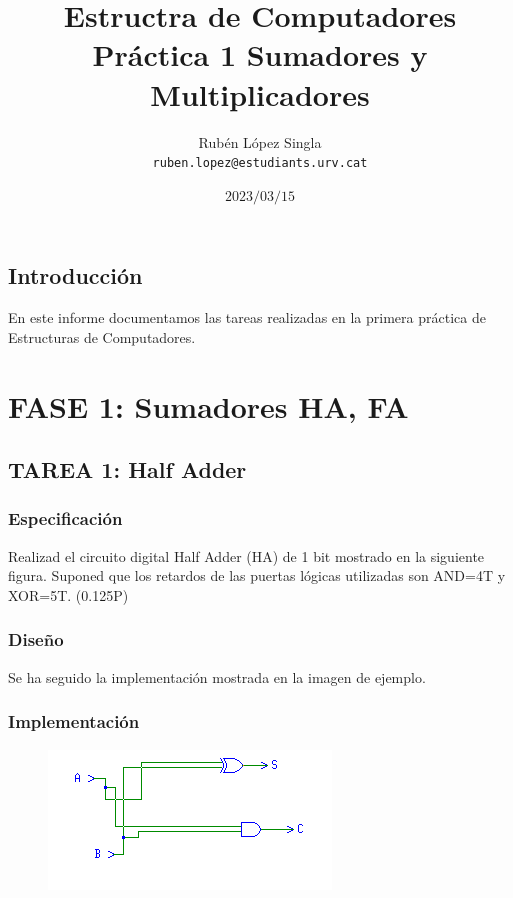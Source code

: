 \documentclass{article}
\title{Estructra de Computadores \\
	Práctica 1
	\medbreak
	\large Sumadores y Multiplicadores \\
	\bigbreak}
\author{Rubén López Singla\\
	\texttt{ruben.lopez@estudiants.urv.cat}
}
\date{\bigbreak $2023/03/15$}
\begin{document}
\maketitle

\newpage
\subsection*{Introducción}
En este informe documentamos las tareas realizadas en la primera práctica de Estructuras de Computadores. 

\renewcommand*\contentsname{Índice}
\setcounter{secnumdepth}{0} %
\tableofcontents


\newpage
\section{FASE 1: Sumadores HA, FA}
	\subsection{TAREA 1: Half Adder}
		\subsubsection*{Especificación}
		Realizad el circuito digital Half Adder (HA) de 1 bit mostrado en la siguiente figura.
		Suponed que los retardos de las puertas lógicas utilizadas son AND=4T y XOR=5T. (0.125P)

		\subsubsection*{Diseño}
		Se ha seguido la implementación mostrada en la imagen de ejemplo.


		\subsubsection*{Implementación}
		 \begin{figure}[ht]
		 	\includegraphics[width=0.8\linewidth]{HA}
			\centering
		 \end{figure}
\end{document}

